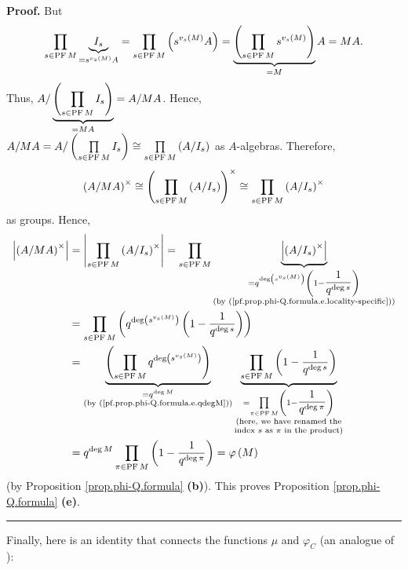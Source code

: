 \documentclass[numbers=enddot,12pt,final,onecolumn,notitlepage]{scrartcl}%
\theoremstyle{definition}
\newenvironment{proof}[1][Proof]{\noindent\textbf{#1.} }{\ \rule{0.5em}{0.5em}}
\let\prodnonlimits\prod
\renewcommand{\prod}{\prodnonlimits\limits}
\begin{document}
\begin{proof}
But
\[
\prod\limits_{s\in\operatorname*{PF}M}\underbrace{I_{s}}_{=s^{v_{s}\left(
M\right)  }A}=\prod\limits_{s\in\operatorname*{PF}M}\left(  s^{v_{s}\left(
M\right)  }A\right)  =\underbrace{\left(  \prod_{s\in\operatorname*{PF}%
M}s^{v_{s}\left(  M\right)  }\right)  }_{=M}A=MA.
\]
Thus, $A/\underbrace{\left(  \prod\limits_{s\in\operatorname*{PF}M}%
I_{s}\right)  }_{=MA}=A/MA$. Hence, $A/MA=A/\left(  \prod\limits_{s\in
\operatorname*{PF}M}I_{s}\right)  \cong\prod\limits_{s\in\operatorname*{PF}%
M}\left(  A/I_{s}\right)  $ as $A$-algebras. Therefore,%
\[
\left(  A/MA\right)  ^{\times}\cong\left(  \prod\limits_{s\in
\operatorname*{PF}M}\left(  A/I_{s}\right)  \right)  ^{\times}\cong%
\prod\limits_{s\in\operatorname*{PF}M}\left(  A/I_{s}\right)  ^{\times}%
\]
as groups. Hence,%
\begin{align*}
\left\vert \left(  A/MA\right)  ^{\times}\right\vert  &  =\left\vert
\prod\limits_{s\in\operatorname*{PF}M}\left(  A/I_{s}\right)  ^{\times
}\right\vert =\prod\limits_{s\in\operatorname*{PF}M}\underbrace{\left\vert
\left(  A/I_{s}\right)  ^{\times}\right\vert }_{\substack{=q^{\deg\left(
s^{v_{s}\left(  M\right)  }\right)  }\left(  1-\dfrac{1}{q^{\deg s}}\right)
\\\text{(by (\ref{pf.prop.phi-Q.formula.e.locality-specific}))}}}\\
&  =\prod\limits_{s\in\operatorname*{PF}M}\left(  q^{\deg\left(
s^{v_{s}\left(  M\right)  }\right)  }\left(  1-\dfrac{1}{q^{\deg s}}\right)
\right) \\
&  =\underbrace{\left(  \prod\limits_{s\in\operatorname*{PF}M}q^{\deg\left(
s^{v_{s}\left(  M\right)  }\right)  }\right)  }_{\substack{=q^{\deg
M}\\\text{(by (\ref{pf.prop.phi-Q.formula.e.qdegM}))}}}\underbrace{\prod
\limits_{s\in\operatorname*{PF}M}\left(  1-\dfrac{1}{q^{\deg s}}\right)
}_{\substack{=\prod\limits_{\pi\in\operatorname*{PF}M}\left(  1-\dfrac
{1}{q^{\deg\pi}}\right)  \\\text{(here, we have renamed the}\\\text{index
}s\text{ as }\pi\text{ in the product)}}}\\
&  =q^{\deg M}\prod\limits_{\pi\in\operatorname*{PF}M}\left(  1-\dfrac
{1}{q^{\deg\pi}}\right)  =\varphi\left(  M\right)
\end{align*}
(by Proposition \ref{prop.phi-Q.formula} \textbf{(b)}). This proves
Proposition \ref{prop.phi-Q.formula} \textbf{(e)}.
\end{proof}

Finally, here is an identity that connects the functions $\mu$ and
$\varphi_{C}$ (an analogue of \cite[(12.347)]{reiner-hopf}):
\end{document}
